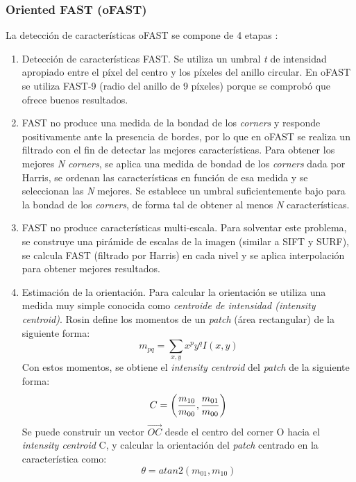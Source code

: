 \subsubsection{Oriented FAST (oFAST)}

La detección de características oFAST se compone de 4 etapas :
\begin{enumerate}

\item Detección de características FAST. Se utiliza un umbral \textsl{t} de intensidad apropiado entre el píxel del centro y los píxeles del anillo circular. En oFAST se utiliza FAST-9 (radio del anillo de 9 píxeles) porque se comprobó que ofrece buenos resultados.

\item FAST no produce una medida de la bondad de los \textit{corners} y responde positivamente ante la presencia de bordes, por lo que en oFAST se realiza un filtrado con el fin de detectar las mejores características. Para obtener los mejores \textsl{N} \textit{corners}, se aplica una medida de bondad de los \textit{corners} dada por Harris\cite{Harris88alvey}, se ordenan las características en función de esa medida y se seleccionan las \textsl{N} mejores. Se establece un umbral suficientemente bajo para la bondad de los \textit{corners}, de forma tal de obtener al menos \textsl{N} características.

\item FAST no produce características multi-escala. Para solventar este problema, se construye una pirámide de escalas de la imagen (similar a SIFT y SURF), se calcula FAST (filtrado por Harris) en cada nivel y se aplica interpolación para obtener mejores resultados.

\item Estimación de la orientación. Para calcular la orientación se utiliza una medida muy simple conocida como \textit{centroide de intensidad (intensity centroid)}. Rosin \cite{Rosin99measuringcorner} define los momentos de un \textit{patch} (área rectangular) de la siguiente forma:
\begin{equation}
m_{pq} = \sum_{x,y} x^{p}y^{q}I(x,y)
\end{equation}
Con estos momentos, se obtiene el \textit{intensity centroid} del \textit{patch} de la siguiente forma:
\begin{equation}
C = \left(
\frac{m_{10}}{m_{00}} , \frac{m_{01}}{m_{00}} \\
\right)
\end{equation}
Se puede construir un vector $\vec{OC}$ desde el centro del corner O hacia el \textit{intensity centroid} C, y calcular la orientación del \textit{patch} centrado en la característica como:
\begin{equation}
\theta = atan2(m_{01}, m_{10})
\end{equation}

\end{enumerate}

